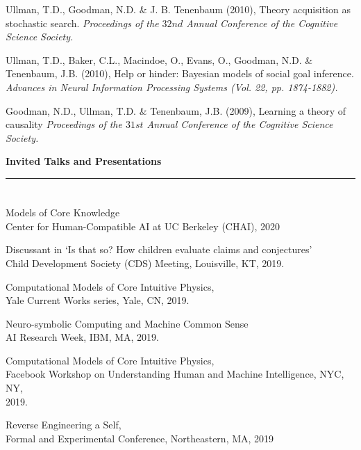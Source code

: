 \documentclass[margin,line,pifont,palatino,courier]{res}
\begin{document}
\begin{resume}
Ullman, T.D., Goodman, N.D. \& J. B. Tenenbaum (2010), Theory acquisition as stochastic search. \textit{Proceedings of the $32nd$ Annual Conference of the Cognitive Science Society.}

Ullman, T.D., Baker, C.L., Macindoe, O., Evans, O., Goodman, N.D. \& Tenenbaum, J.B. (2010), Help or hinder: Bayesian models of social goal inference. \textit{Advances in Neural Information Processing Systems (Vol. 22, pp. 1874-1882).}

Goodman, N.D., Ullman, T.D. \& Tenenbaum, J.B. (2009), Learning a theory of causality \textit{Proceedings of the $31st$ Annual Conference of the Cognitive Science Society.}

\vspace{20pt}
\begin{adjustwidth*}{-3.3cm}{-2cm}

\hspace{-3.8em}\textbf{Invited Talks and Presentations}\\
\hspace*{-3.8em}\noindent\rule{8cm}{0.4pt}

\end{adjustwidth*}

\section{\sc }

Models of Core Knowledge\\
Center for Human-Compatible AI at UC Berkeley (CHAI), 2020

Discussant in `Is that so? How children evaluate claims and conjectures'\\
Child Development Society (CDS) Meeting, Louisville, KT, 2019.

Computational Models of Core Intuitive Physics,\\
Yale Current Works series, Yale, CN, 2019.

Neuro-symbolic Computing and Machine Common Sense\\
AI Research Week, IBM, MA, 2019.

Computational Models of Core Intuitive Physics,\\
Facebook Workshop on Understanding Human and Machine Intelligence, NYC, NY,\\
2019.

Reverse Engineering a Self,\\
Formal and Experimental Conference, Northeastern, MA, 2019


\end{resume}
\end{document}

